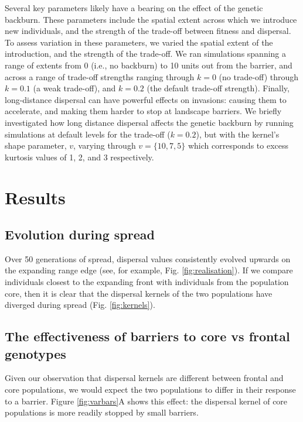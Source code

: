\documentclass{article}
\begin{document}
Several key parameters likely have a bearing on the effect of the genetic backburn.  These parameters include the spatial extent across which we introduce new individuals, and the strength of the trade-off between fitness and dispersal.  To assess variation in these parameters, we varied the spatial extent of the introduction, and the strength of the trade-off.  We ran simulations spanning a range of
extents from 0 (i.e., no backburn) to 10 units out from the barrier, and across a range of trade-off strengths ranging through $k=0$ (no trade-off) through $k=0.1$ (a weak trade-off), and $k=0.2$ (the default trade-off strength).  Finally, long-distance dispersal can have powerful effects on invasions: causing them to accelerate, and making them harder to stop at landscape barriers.  We briefly investigated how long distance dispersal affects the genetic backburn by running simulations at default levels for the trade-off ($k=0.2$), but with the kernel's shape parameter, $v$, varying through $v=\{10, 7, 5\}$ which corresponds to excess kurtosis values of 1, 2, and 3 respectively.


  
    

\section{Results}\label{results}

\subsection{Evolution during spread}\label{evolution-during-spread}

Over 50 generations of spread, dispersal values consistently evolved upwards on the expanding
range edge (see, for example, Fig. \ref{fig:realisation}). If we compare individuals closest to the expanding front
with individuals from the population core, then it is clear that the dispersal kernels of the two populations have diverged
during spread (Fig. \ref{fig:kernels}).

\subsection{The effectiveness of barriers to core vs frontal
genotypes}\label{the-effectiveness-of-barriers-to-core-vs-frontal-genotypes-1}

Given our observation that dispersal kernels are different between
frontal and core populations, we would expect the two populations to differ in
their response to a barrier. Figure \ref{fig:varbars}A shows this effect: the dispersal kernel of core
populations is more readily stopped
by small barriers.
\end{document}
